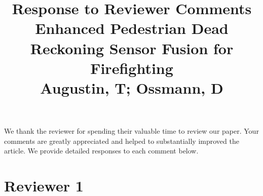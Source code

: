 \documentclass{article}
\begin{document}
\title{\textsf{Response to Reviewer Comments} \\ [+2mm] \small Enhanced Pedestrian Dead Reckoning Sensor Fusion for Firefighting
\\ [+2mm]
Augustin, T; Ossmann, D}

\date{}
\maketitle

We  thank the reviewer for spending their valuable time to review our paper. Your comments are greatly appreciated and helped to substantially improved the article. We provide detailed responses to each comment below.


\section*{Reviewer 1}
\end{document}
